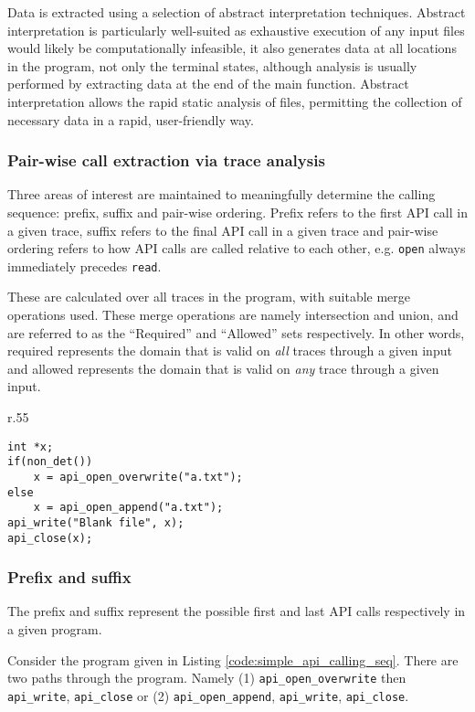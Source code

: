 \documentclass[EPiCempty]{easychair}
\begin{document}
Data is extracted using a selection of abstract interpretation techniques.  Abstract interpretation is particularly well-suited as exhaustive execution of any input files would likely be computationally infeasible, it also generates data at all locations in the program, not only the terminal states, although analysis is usually performed by extracting data at the end of the main function. Abstract interpretation allows the rapid static analysis of files, permitting the collection of necessary data in a rapid, user-friendly way.

\subsubsection{Pair-wise call extraction via trace analysis}
Three areas of interest are maintained to meaningfully determine the calling sequence:  prefix, suffix and pair-wise ordering.   Prefix refers to the first API call in a given trace, suffix refers to the final API call in a given trace and pair-wise ordering refers to how API calls are called relative to each other, e.g. \texttt{open} always immediately precedes \texttt{read}.  

These are calculated over all traces in the program, with suitable merge operations used.  These merge operations are namely intersection and union, and are referred to as the \enquote{Required} and \enquote{Allowed} sets respectively.  In other words, required represents the domain that is valid on \textit{all} traces through a given input and allowed represents the domain that is valid on \textit{any} trace through a given input.  

\begin{wrapfigure}{r}{.55\textwidth}
\begin{lstlisting}[caption={A simple API calling sequence.}, numbers=none, label={code:simple_api_calling_seq}]
int *x;
if(non_det())
	x = api_open_overwrite("a.txt");
else
	x = api_open_append("a.txt");
api_write("Blank file", x);
api_close(x);
\end{lstlisting}
\end{wrapfigure}


\subsubsection{Prefix and suffix}
The prefix and suffix represent the possible first and last API calls respectively in a given program.

Consider the program given in Listing \ref{code:simple_api_calling_seq}.  There are two paths through the program.  Namely (1) \texttt{api\_open\_overwrite} then \texttt{api\_write}, \texttt{api\_close} or (2) \texttt{api\_open\_append}, \texttt{api\_write}, \texttt{api\_close}.
\end{document}
